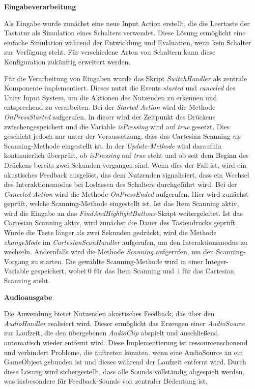 {\normalfont \bfseries Eingabeverarbeitung}

Als Eingabe wurde zunächst eine neue Input Action erstellt, die die Leertaste der Tastatur als Simulation eines Schalters verwendet. Diese Lösung ermöglicht eine einfache Simulation während der Entwicklung und Evaluation, wenn kein Schalter zur Verfügung steht. Für verschiedene Arten von Schaltern kann diese Konfiguration zukünftig erweitert werden.

Für die Verarbeitung von Eingaben wurde das Skript \textit{SwitchHandler} als zentrale Komponente implementiert. Dieses nutzt die Events \textit{started} und \textit{canceled} des Unity Input System, um die Aktionen des Nutzenden zu erkennen und entsprechend zu verarbeiten. Bei der \textit{Started-Action} wird die Methode \textit{OnPressStarted} aufgerufen. In dieser wird der Zeitpunkt des Drückens zwischengespeichert und die Variable \textit{isPressing} wird auf \textit{true} gesetzt. Dies geschieht jedoch nur unter der Voraussetzung, dass das Cartesian Scanning als Scanning-Methode eingestellt ist. In der \textit{Update-Methode} wird daraufhin kontinuierlich überprüft, ob \textit{isPressing} auf \textit{true} steht und ob seit dem Beginn des Drückens bereits zwei Sekunden vergangen sind. Wenn dies der Fall ist, wird ein akustisches Feedback ausgelöst, das dem Nutzenden signalisiert, dass ein Wechsel des Interaktionsmodus bei Loslassen des Schalters durchgeführt wird.
Bei der \textit{Canceled-Action} wird die Methode \textit{OnPressEnded} aufgerufen. Hier wird zunächst geprüft, welche Scanning-Methode eingestellt ist. Ist das Item Scanning aktiv, wird die Eingabe an das \textit{FindAndHighlightButtons}-Skript weitergeleitet. Ist das Cartesian Scanning aktiv, wird zunächst die Dauer des Tastendrucks geprüft. Wurde die Taste länger als zwei Sekunden gedrückt, wird die Methode \textit{changeMode} im \textit{CartesianScanHandler} aufgerufen, um den Interaktionsmodus zu wechseln. Andernfalls wird die Methode \textit{Scanning} aufgerufen, um den Scanning-Vorgang zu starten. Die gewählte Scanning-Methode wird in einer Integer-Variable gespeichert, wobei 0 für das Item Scanning und 1 für das Cartesian Scanning steht. 

{\normalfont \bfseries Audioausgabe}

Die Anwendung bietet Nutzenden akustisches Feedback, das über den \textit{AudioHandler} realisiert wird. Dieser ermöglicht das Erzeugen einer \textit{AudioSource} zur Laufzeit, die den übergebenen \textit{AudioClip} abspielt und anschließend automatisch wieder entfernt wird. Diese Implementierung ist ressourcenschonend und verhindert Probleme, die auftreten könnten, wenn eine AudioSource an ein GameObject gebunden ist und dieses während der Laufzeit entfernt wird. Durch diese Lösung wird sichergestellt, dass alle Sounds vollständig abgespielt werden, was insbesondere für Feedback-Sounds von zentraler Bedeutung ist.

